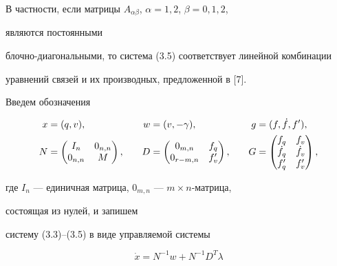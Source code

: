  


В частности, если матрицы $A_{\alpha\beta}$, $\alpha=1,2$, $\beta=0,1,2$, 


являются постоянными 


блочно-диагональными, то система (3.5) соответствует линейной комбинации 


уравнений связей и их производных, предложенной в [7]. 


 


Введем обозначения 


\begin{alignat}{3} 


x&=(q,v), &\quad w&=(v,-\gamma), &\quad g&=(f,\Dot f,f'),\notag \\ 


N&= 


\begin{pmatrix} 


I_n & 0_{n,n} \\ 0_{n,n} & M 


\end{pmatrix} 


, &\quad D&= 


\begin{pmatrix} 


0_{m,n} & f_q \\ 0_{r-m,n} & f'_v 


\end{pmatrix} 


, &\quad G&= 


\begin{pmatrix} 


f_q & f_v \\ \Dot f_q & \Dot f_v \\ f'_q & f'_v 


\end{pmatrix} 


, 


\end{alignat} 


где $I_n$ --- единичная матрица, $0_{m,n}$ --- $m\times n$-матрица, 


состоящая из нулей, и запишем 


систему (3.3)--(3.5) в виде управляемой системы 


\begin{equation} 


\Dot x=N^{-1}w+N^{-1}D^T\lambda 


\end{equation} 


